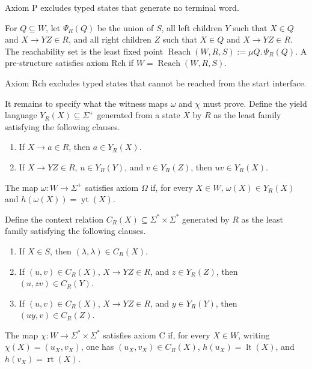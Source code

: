 \documentclass[sub]{jalc}
\newcommand{\yt}{\operatorname{yt}}
\newcommand{\lt}{\operatorname{lt}}
\newcommand{\rt}{\operatorname{rt}}
\newcommand{\Reach}{\operatorname{Reach}}
\begin{document}
Axiom P excludes typed states that generate no terminal word.

\begin{definition}
\label{def:reachability-fixed-point}
For \(Q\subseteq W\), let \(\Psi_R(Q)\) be the union of \(S\), all left children \(Y\) such that \(X\in Q\) and \(X\to YZ\in R\), and all right children \(Z\) such that \(X\in Q\) and \(X\to YZ\in R\). The reachability set is the least fixed point \(\Reach(W,R,S):=\mu Q.\,\Psi_R(Q)\). A pre-structure satisfies axiom Rch if \(W=\Reach(W,R,S)\).
\end{definition}

Axiom Rch excludes typed states that cannot be reached from the start interface.

It remains to specify what the witness maps \(\omega\) and \(\chi\) must prove. Define the yield language \(Y_R(X)\subseteq\Sigma^+\) generated from a state \(X\) by \(R\) as the least family satisfying the following clauses.
\begin{enumerate}[label=\textup{(\roman*)},leftmargin=2.2em]
\item If \(X\to a\in R\), then \(a\in Y_R(X)\).
\item If \(X\to YZ\in R\), \(u\in Y_R(Y)\), and \(v\in Y_R(Z)\), then \(uv\in Y_R(X)\).
\end{enumerate}

\begin{definition}
\label{def:axiom-Omega}
The map \(\omega:W\to\Sigma^+\) satisfies axiom \(\Omega\) if, for every \(X\in W\), \(\omega(X)\in Y_R(X)\) and \(h(\omega(X))=\yt(X)\).
\end{definition}

Define the context relation \(C_R(X)\subseteq\Sigma^*\times\Sigma^*\) generated by \(R\) as the least family satisfying the following clauses.
\begin{enumerate}[label=\textup{(\roman*)},leftmargin=2.2em]
\item If \(X\in S\), then \((\lambda,\lambda)\in C_R(X)\).
\item If \((u,v)\in C_R(X)\), \(X\to YZ\in R\), and \(z\in Y_R(Z)\), then \((u,zv)\in C_R(Y)\).
\item If \((u,v)\in C_R(X)\), \(X\to YZ\in R\), and \(y\in Y_R(Y)\), then \((uy,v)\in C_R(Z)\).
\end{enumerate}

\begin{definition}
\label{def:axiom-C}
The map \(\chi:W\to\Sigma^*\times\Sigma^*\) satisfies axiom C if, for every \(X\in W\), writing \(\chi(X)=(u_X,v_X)\), one has \((u_X,v_X)\in C_R(X)\), \(h(u_X)=\lt(X)\), and \(h(v_X)=\rt(X)\).
\end{definition}
\end{document}
